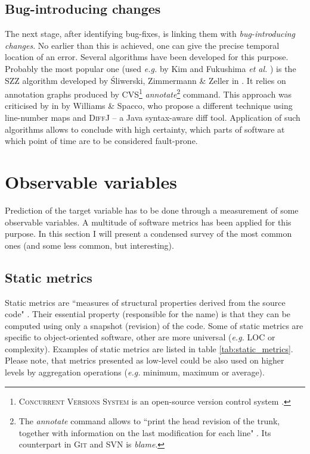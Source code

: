 \documentclass{pracamgr}
\begin{document}
\subsection{Bug-introducing changes}
\label{sec:bug-introducing}
The next stage, after identifying bug-fixes, is linking them with \emph{bug-introducing changes}. No earlier than this is achieved, one can give the precise temporal location of an error. Several algorithms have been developed for this purpose. Probably the most popular one (used \textit{e.g.} by Kim \cite{adaptive} and Fukushima \textit{et al.} \cite{Fukushima}) is the SZZ algorithm developed by Śliwerski, Zimmermann \& Zeller in \cite{SZZ}. It relies on annotation graphs produced by CVS\footnote{\textsc{Concurrent Versions System} is an open-source version control system \cite{CVS}.} \emph{annotate}\footnote{The \emph{annotate} command allows to ``print the head revision of the trunk, together with information on the last modification for each line" \cite{CVS_annotate}. Its counterpart in \textsc{Git} and SVN is \emph{blame}.} command. This approach was criticised by in \cite{SZZ_revisited} by Williams \& Spacco, who propose a different technique using line-number maps and \textsc{DiffJ} -- a Java syntax-aware diff tool. Application of such algorithms allows to conclude with high certainty, which parts of software at which point of time are to be considered fault-prone.

\section{Observable variables}
\label{sec:observable_variables}
Prediction of the target variable has to be done through a measurement of some observable variables. A multitude of software metrics has been applied for this purpose. In this section I will present a condensed survey of the most common ones (and some less common, but interesting).

\subsection{Static metrics}
\label{sec:static}
Static metrics are ``measures of structural properties derived from the source code" \cite[p.~5]{systematic}. Their essential property (responsible for the name) is that they can be computed using only a snapshot (revision) of the code. Some of static metrics are specific to object-oriented software, other are more universal (\textit{e.g.} LOC or complexity). Examples of static metrics are listed in table \ref{tab:static_metrics}. Please note, that metrics presented as low-level could be also used on higher levels by aggregation operations (\textit{e.g.} minimum, maximum or average).
\end{document}
